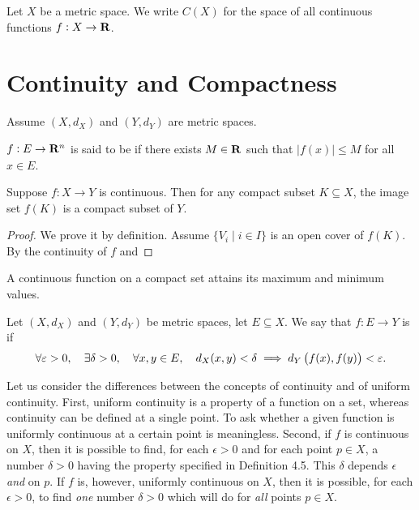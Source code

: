 \begin{definition}
Let $X$ be a metric space. We write $C(X)$ for the space of all continuous functions $f:X\to\mathbf R$.
\end{definition}



\section{Continuity and Compactness}
Assume $(X,d_X)$ and $(Y,d_Y)$ are metric spaces.

\begin{definition}[Bounded]
$f:E\to\mathbf R^n$ is said to be  if there exists $M\in\mathbf R$ such that $|f(x)|\le M$ for all $x\in E$.
\end{definition}

\begin{theorem}
Suppose $f:X\to Y$ is continuous. Then for any compact subset $K\subseteq X$, the image set $f(K)$ is a compact subset of $Y$.
\end{theorem}

\begin{proof}
We prove it by definition. Assume $\{V_i\mid i\in I\}$ is an open cover of $f(K)$. By the continuity of $f$ and 
\end{proof}

\begin{theorem}
A continuous function on a compact set attains its maximum and minimum values.
\end{theorem}

\begin{definition}
Let $(X,d_X)$ and $(Y,d_Y)$ be metric spaces, let $E\subseteq X$. We say that $f:E\to Y$ is  if
\[\forall\varepsilon>0,\quad\exists\delta>0,\quad\forall x,y\in E,\quad d_X(x,y)<\delta\implies d_Y\left(f(x),f(y)\right)<\varepsilon.\]
\end{definition}

Let us consider the differences between the concepts of continuity and of uniform continuity. First, uniform continuity is a property of a function on a set, whereas continuity can be defined at a single point. To ask whether a given function is uniformly continuous at a certain point is meaningless. Second, if $f$ is continuous on $X$, then it is possible to find, for each $\epsilon>0$ and for each point $p\in X$, a number $\delta>0$ having the property specified in Definition 4.5. This $\delta$ depends $\epsilon$ \emph{and} on $p$. If $f$ is, however, uniformly continuous on $X$, then it is possible, for each $\epsilon>0$, to find \emph{one} number $\delta>0$ which will do for \emph{all} points $p\in X$.

